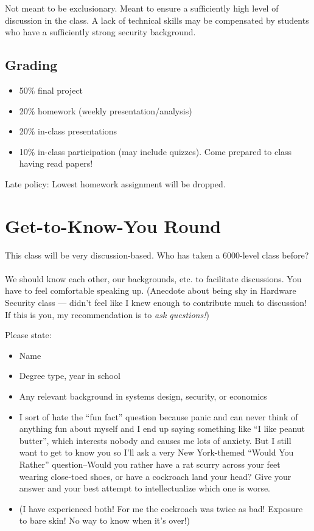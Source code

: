 \documentclass[11pt]{article}
\begin{document}
Not meant to be exclusionary. Meant to ensure a sufficiently high level of discussion in the class. 
A lack of technical skills may be compensated by students who have a sufficiently strong security background.


\subsection{Grading}

\begin{itemize}
    \item 50\% final project 
    \item 20\% homework (weekly presentation/analysis)
    \item 20\% in-class presentations
    \item 10\% in-class participation (may include quizzes). Come prepared to class having read papers! 
\end{itemize}

Late policy: Lowest homework assignment will be dropped. 

\section{Get-to-Know-You Round}

This class will be very discussion-based. Who has taken a 6000-level class before?
\\ \\ 
We should know each other, our backgrounds, etc. to facilitate discussions. You have to feel comfortable speaking up. (Anecdote about being shy in Hardware Security class --- didn't feel like I knew enough to contribute much to discussion! If this is you, my recommendation is to {\it ask questions!})

Please state:

\begin{itemize}
    \item Name
    \item Degree type, year in school
    \item Any relevant background in systems design, security, or economics
    \item I sort of hate the ``fun fact'' question because panic and can never think of anything fun about myself and I end up saying something like ``I like peanut butter'', which interests nobody and causes me lots of anxiety. 
    But I still want to get to know you so I'll ask a very New York-themed ``Would You Rather'' question--Would you rather have a rat scurry across your feet wearing close-toed shoes, or have a cockroach land your head? Give your answer and your best attempt to intellectualize which one is worse. 
    \item (I have experienced both! For me the cockroach was twice as bad! Exposure to bare skin! No way to know when it's over!)
\end{itemize}
\end{document}
